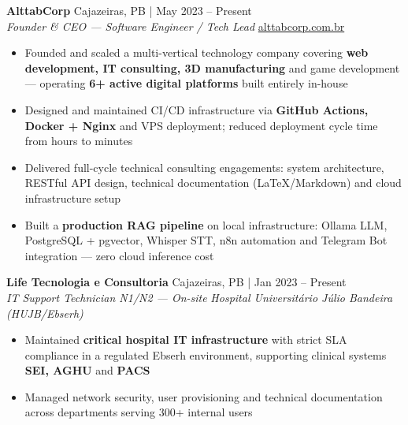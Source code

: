 \documentclass[a4paper]{article}
\begin{document}
\vspace{2mm}

\textbf{AlttabCorp} \hfill Cajazeiras, PB | May 2023 -- Present\\
\textit{Founder \& CEO — Software Engineer / Tech Lead} \hfill \href{https://alttabcorp.com.br}{alttabcorp.com.br}\\
\vspace{-3mm}
\begin{itemize}[leftmargin=*, itemsep=-3pt]
    \item Founded and scaled a multi-vertical technology company covering \textbf{web development, IT consulting, 3D manufacturing} and game development — operating \textbf{6+ active digital platforms} built entirely in-house
    \item Designed and maintained CI/CD infrastructure via \textbf{GitHub Actions, Docker + Nginx} and VPS deployment; reduced deployment cycle time from hours to minutes
    \item Delivered full-cycle technical consulting engagements: system architecture, RESTful API design, technical documentation (LaTeX/Markdown) and cloud infrastructure setup
    \item Built a \textbf{production RAG pipeline} on local infrastructure: Ollama LLM, PostgreSQL + pgvector, Whisper STT, n8n automation and Telegram Bot integration — zero cloud inference cost
\end{itemize}

\vspace{2mm}

\textbf{Life Tecnologia e Consultoria} \hfill Cajazeiras, PB | Jan 2023 -- Present\\
\textit{IT Support Technician N1/N2 — On-site} \hfill \textit{Hospital Universit\'{a}rio J\'{u}lio Bandeira (HUJB/Ebserh)}\\
\vspace{-3mm}
\begin{itemize}[leftmargin=*, itemsep=-3pt]
    \item Maintained \textbf{critical hospital IT infrastructure} with strict SLA compliance in a regulated Ebserh environment, supporting clinical systems \textbf{SEI, AGHU} and \textbf{PACS}
    \item Managed network security, user provisioning and technical documentation across departments serving 300+ internal users
\end{itemize}

\vspace{2mm}
\end{document}
